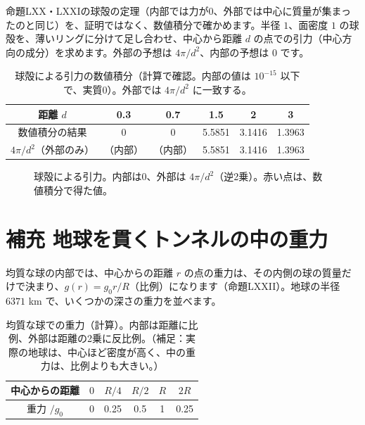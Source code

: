 \documentclass[a4paper,11pt,openany]{ltjsbook}
\begin{document}
命題LXX・LXXIの球殻の定理（内部では力が0、外部では中心に質量が集まったのと同じ）を、証明ではなく、数値積分で確かめます。半径 $1$、面密度 $1$ の球殻を、薄いリングに分けて足し合わせ、中心から距離 $d$ の点での引力（中心方向の成分）を求めます。外部の予想は $4\pi/d^2$、内部の予想は $0$ です。

\begin{table}[htbp]
\centering
\begin{tabular}{c|ccccc}
\toprule
距離 $d$ & 0.3 & 0.7 & 1.5 & 2 & 3\\
\midrule
数値積分の結果 & 0 & 0 & 5.5851 & 3.1416 & 1.3963\\
$4\pi/d^2$（外部のみ） & （内部） & （内部） & 5.5851 & 3.1416 & 1.3963\\
\bottomrule
\end{tabular}
\caption{球殻による引力の数値積分（計算で確認。内部の値は $10^{-15}$ 以下で、実質0）。外部では $4\pi/d^2$ に一致する。}
\end{table}

\begin{figure}[htbp]
\centering
{}
\caption{球殻による引力。内部は0、外部は $4\pi/d^2$（逆2乗）。赤い点は、数値積分で得た値。}
\end{figure}

\section{補充 地球を貫くトンネルの中の重力}

均質な球の内部では、中心からの距離 $r$ の点の重力は、その内側の球の質量だけで決まり、$g(r)=g_0r/R$（比例）になります（命題LXXII）。地球の半径 $6371$ km で、いくつかの深さの重力を並べます。

\begin{table}[htbp]
\centering
\begin{tabular}{c|ccccc}
\toprule
中心からの距離 & $0$ & $R/4$ & $R/2$ & $R$ & $2R$\\
\midrule
重力 $/g_0$ & 0 & 0.25 & 0.5 & 1 & 0.25\\
\bottomrule
\end{tabular}
\caption{均質な球での重力（計算）。内部は距離に比例、外部は距離の2乗に反比例。（補足：実際の地球は、中心ほど密度が高く、中の重力は、比例よりも大きい。）}
\end{table}
\end{document}
